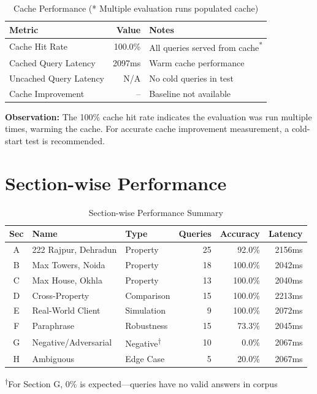 \documentclass[11pt,a4paper]{article}
\begin{document}
\begin{table}[H]
\centering
\begin{tabular}{lrl}
\toprule
\textbf{Metric} & \textbf{Value} & \textbf{Notes} \\
\midrule
Cache Hit Rate & 100.0\% & All queries served from cache\textsuperscript{*} \\
Cached Query Latency & 2097ms & Warm cache performance \\
Uncached Query Latency & N/A & No cold queries in test \\
Cache Improvement & -- & Baseline not available \\
\bottomrule
\end{tabular}
\caption{Cache Performance (* Multiple evaluation runs populated cache)}
\end{table}

\textbf{Observation:} The 100\% cache hit rate indicates the evaluation was run multiple times, warming the cache. For accurate cache improvement measurement, a cold-start test is recommended.

\section{Section-wise Performance}

\begin{table}[H]
\centering
\begin{tabularx}{\textwidth}{clXrrr}
\toprule
\textbf{Sec} & \textbf{Name} & \textbf{Type} & \textbf{Queries} & \textbf{Accuracy} & \textbf{Latency} \\
\midrule
A & 222 Rajpur, Dehradun & Property & 25 & \textcolor{pass}{92.0\%} & 2156ms \\
B & Max Towers, Noida & Property & 18 & \textcolor{pass}{100.0\%} & 2042ms \\
C & Max House, Okhla & Property & 13 & \textcolor{pass}{100.0\%} & 2040ms \\
D & Cross-Property & Comparison & 15 & \textcolor{pass}{100.0\%} & 2213ms \\
E & Real-World Client & Simulation & 9 & \textcolor{pass}{100.0\%} & 2072ms \\
F & Paraphrase & Robustness & 15 & \textcolor{warn}{73.3\%} & 2045ms \\
G & Negative/Adversarial & Negative\textsuperscript{†} & 10 & \textcolor{info}{0.0\%} & 2067ms \\
H & Ambiguous & Edge Case & 5 & \textcolor{warn}{20.0\%} & 2067ms \\
\bottomrule
\end{tabularx}
\caption{Section-wise Performance Summary}
{\small \textsuperscript{†}For Section G, 0\% is expected---queries have no valid answers in corpus}
\end{table}
\end{document}
